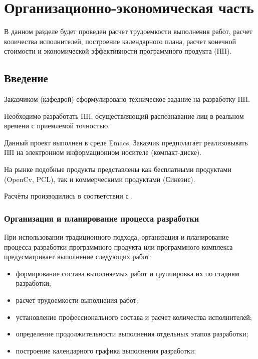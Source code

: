 \section{Организационно-экономическая часть}

В данном разделе будет проведен расчет трудоемкости выполнения работ, расчет количества исполнителей,
построение календарного плана, расчет конечной стоимости и экономической эффективности программного продукта (ПП).

\subsection{Введение}

Заказчиком (кафедрой) сформулировано техническое задание на разработку ПП.

Необходимо разработать ПП, осуществляющий распознавание лиц в реальном
времени с приемлемой точностью.

Данный проект выполнен в среде Emacs.
Заказчик предполагает реализовывать ПП на электронном информационном
носителе (компакт-диске).

На рынке подобные продукты представлены как
бесплатными продуктами (OpenCv, PCL), так и коммерческими продуктами (Синезис).

Расчёты производились в соответствии с \cite{econ_1}.

\subsubsection{Организация и планирование процесса разработки}

При использовании традиционного подхода, организация и планирование
процесса разработки программного продукта или программного комплекса
предусматривает выполнение следующих работ:
\begin{itemize}
	\item формирование состава выполняемых работ и группировка их по
	стадиям разработки;
	\item расчет трудоемкости выполнения работ;
	\item установление профессионального состава и расчет количества
	исполнителей;
	\item определение продолжительности выполнения отдельных этапов разработки;
	\item построение календарного графика выполнения разработки;
\end{itemize}

